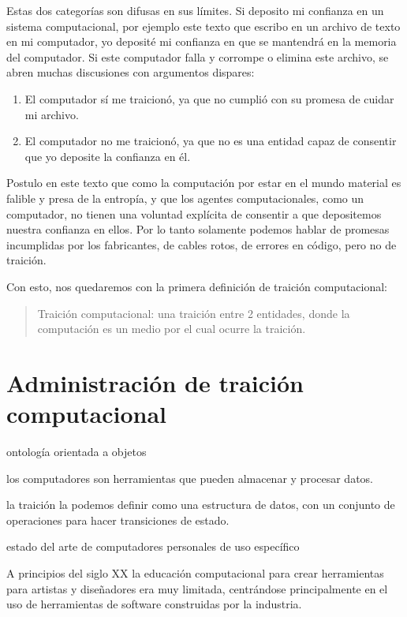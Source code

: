 \documentclass{article}
\begin{document}
Estas dos categorías son difusas en sus límites. Si deposito mi confianza en un sistema computacional, por ejemplo este texto que escribo en un archivo de texto en mi computador, yo deposité mi confianza en que se mantendrá en la memoria del computador. Si este computador falla y corrompe o elimina este archivo, se abren muchas discusiones con argumentos dispares:

\begin{enumerate}
    \item El computador sí me traicionó, ya que no cumplió con su promesa de cuidar mi archivo.
    \item El computador no me traicionó, ya que no es una entidad capaz de consentir que yo deposite la confianza en él.
\end{enumerate}

Postulo en este texto que como la computación por estar en el mundo material es falible y presa de la entropía, y que los agentes computacionales, como un computador, no tienen una voluntad explícita de consentir a que depositemos nuestra confianza en ellos. Por lo tanto solamente podemos hablar de promesas incumplidas por los fabricantes, de cables rotos, de errores en código, pero no de traición.

Con esto, nos quedaremos con la primera definición de traición computacional:

\begin{quote}
    Traición computacional: una traición entre 2 entidades, donde la computación es un medio por el cual ocurre la traición.
\end{quote}

\clearpage

\section{Administración de traición computacional}

ontología orientada a objetos

los computadores son herramientas que pueden almacenar y procesar datos.

la traición la podemos definir como una estructura de datos, con un conjunto de operaciones para hacer transiciones de estado.

estado del arte de computadores personales de uso específico

A principios del siglo XX la educación computacional para crear herramientas para artistas y diseñadores era muy limitada, centrándose principalmente en el uso de herramientas de software construidas por la industria.
\end{document}
